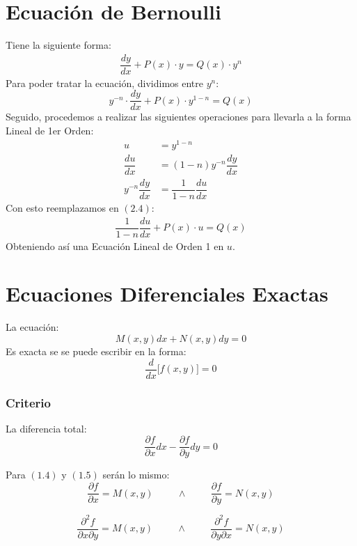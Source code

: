 \section{Ecuación de Bernoulli}
Tiene la siguiente forma:
\begin{align}
\dfrac{dy}{dx}+P(x)\cdot y =Q(x)\cdot y^n 
\end{align}
Para poder tratar la ecuación, dividimos entre $y^n$:
$$y^{-n}\cdot\dfrac{dy}{dx}+P(x)\cdot y^{1-n} =Q(x)$$
Seguido, procedemos a realizar las siguientes operaciones para llevarla a la forma Lineal de 1er Orden:
\begin{align*}
u &= y^{1-n} \\
\dfrac{du}{dx} &= (1-n)y^{-n} \dfrac{dy}{dx}\\
y^{-n}\dfrac{dy}{dx} &= \dfrac{1}{1-n}\dfrac{du}{dx}
\end{align*}
Con esto reemplazamos en $(2.4)$:
\begin{align}
\dfrac{1}{1-n}\dfrac{du}{dx}+P(x)\cdot u = Q(x)
\end{align}
Obteniendo así una Ecuación Lineal de Orden 1 en $u$.
\section{Ecuaciones Diferenciales Exactas}
La ecuación:
\begin{equation}
M(x,y)dx+N(x,y)dy=0
\end{equation}
Es exacta se se puede escribir en la forma:
$$\dfrac{d}{dx}\Big[ f(x,y) \Big] = 0$$
\subsubsection{Criterio}
La diferencia total:
\begin{equation}
\dfrac{\partial f}{\partial x}dx - \dfrac{\partial f}{\partial y}dy=0
\end{equation}

Para $(1\texttt{.}4)$ y $(1\texttt{.} 5)$ serán lo mismo:
\begin{equation}
\dfrac{\partial f}{\partial x}=M(x,y) \hspace{1cm} \wedge \hspace{1cm} \dfrac{\partial f}{\partial y}=N(x,y)
\end{equation}

$$\dfrac{\partial^2 f}{\partial x \partial y}=M(x,y) \hspace{1cm} \wedge \hspace{1cm} \dfrac{\partial^2 f}{\partial y\partial x}=N(x,y)$$
